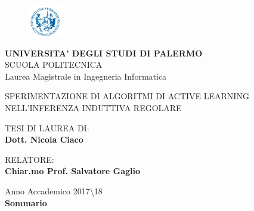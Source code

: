 
\begin{center}
\begin{figure}[!h]
  	\centering
 	\includegraphics[width=1.5cm]{../pictures/frontespizio/logo_unipa_piccolo.png}
\end{figure}
\textsc{\textbf{UNIVERSITA' DEGLI STUDI DI PALERMO}} \\
SCUOLA POLITECNICA\\
\small{Laurea Magistrale in Ingegneria Informatica}\\
\end{center}
\begin{center}
SPERIMENTAZIONE DI ALGORITMI DI ACTIVE LEARNING NELL'INFERENZA INDUTTIVA REGOLARE
\end{center}

\begin{minipage}[t]{0.7\textwidth}\raggedright
{ \scriptsize{TESI DI LAUREA DI:}\\
\scriptsize{\textbf{Dott. Nicola Ciaco}}
}
\end{minipage}
\begin{minipage}[t]{0.47\textwidth}\raggedright
{\scriptsize{RELATORE:}\\
\scriptsize{\textbf{Chiar.mo Prof. Salvatore Gaglio}}
}
\end{minipage}
\begin{center}
{\small Anno Accademico 2017\textbackslash18 \\}%
\vspace{3mm}
\small{\textbf{Sommario}}\\
\end{center}


